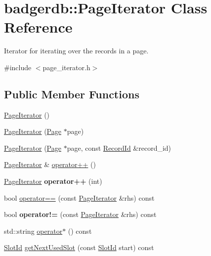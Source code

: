 \hypertarget{classbadgerdb_1_1PageIterator}{\section{badgerdb\-:\-:Page\-Iterator Class Reference}
\label{classbadgerdb_1_1PageIterator}
}


Iterator for iterating over the records in a page.  




{\ttfamily \#include $<$page\-\_\-iterator.\-h$>$}

\subsection*{Public Member Functions}
\begin{DoxyCompactItemize}
\item 
\hyperlink{classbadgerdb_1_1PageIterator_a612d51abd634209c03d672f1328bbc62}{Page\-Iterator} ()
\item 
\hyperlink{classbadgerdb_1_1PageIterator_a53cb54740042b01a78a0b033d8309d4a}{Page\-Iterator} (\hyperlink{classbadgerdb_1_1Page}{Page} $\ast$page)
\item 
\hyperlink{classbadgerdb_1_1PageIterator_ad376a4999169f299874aa85252bca71b}{Page\-Iterator} (\hyperlink{classbadgerdb_1_1Page}{Page} $\ast$page, const \hyperlink{structbadgerdb_1_1RecordId}{Record\-Id} \&record\-\_\-id)
\item 
\hyperlink{classbadgerdb_1_1PageIterator}{Page\-Iterator} \& \hyperlink{classbadgerdb_1_1PageIterator_a2e63f3eea97170b2c566d1549a2215f0}{operator++} ()
\item 
\hypertarget{classbadgerdb_1_1PageIterator_a194774a9a788030f70b166e8c16b11ed}{\hyperlink{classbadgerdb_1_1PageIterator}{Page\-Iterator} {\bfseries operator++} (int)}\label{classbadgerdb_1_1PageIterator_a194774a9a788030f70b166e8c16b11ed}

\item 
bool \hyperlink{classbadgerdb_1_1PageIterator_a1111e07de5972ffd9244e312ac938dac}{operator==} (const \hyperlink{classbadgerdb_1_1PageIterator}{Page\-Iterator} \&rhs) const 
\item 
\hypertarget{classbadgerdb_1_1PageIterator_a44ba172fd75fd065aec5e7004952324d}{bool {\bfseries operator!=} (const \hyperlink{classbadgerdb_1_1PageIterator}{Page\-Iterator} \&rhs) const }\label{classbadgerdb_1_1PageIterator_a44ba172fd75fd065aec5e7004952324d}

\item 
std\-::string \hyperlink{classbadgerdb_1_1PageIterator_a5e9f06b5a70663086720fd919a5b6bdb}{operator$\ast$} () const 
\item 
\hyperlink{namespacebadgerdb_afe9f2f985e7c67e04f76a16f7c4500c8}{Slot\-Id} \hyperlink{classbadgerdb_1_1PageIterator_a7b5eb61bcd7305f0aaa21e0f31d2f917}{get\-Next\-Used\-Slot} (const \hyperlink{namespacebadgerdb_afe9f2f985e7c67e04f76a16f7c4500c8}{Slot\-Id} start) const 
\end{DoxyCompactItemize}


